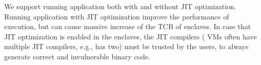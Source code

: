 We support running \java{} application both with and without JIT optimization.
Running \java{} application with JIT optimization
improve the performance of execution,
but can cause massive increase of the TCB of enclaves.
In case that JIT optimization is enabled in the enclaves,
the JIT compilers (\java{} VMs often have multiple JIT compilers, e.g., \jvmname{} has two) must be trusted by the users,
to always generate correct and invulnerable binary code.







